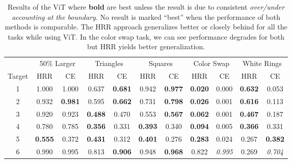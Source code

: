 \documentclass[letterpaper]{article} %
\begin{document}
\begin{table}[!t]
\centering
\begin{tabular}{@{}ccccccccccc@{}}
\toprule
& \multicolumn{2}{c}{50\% Larger} & \multicolumn{2}{c}{Triangles}   & \multicolumn{2}{c}{Squares}     & \multicolumn{2}{c}{Color Swap} & \multicolumn{2}{c}{White Rings} \\ \cmidrule(r){2-3} \cmidrule(r){4-5} \cmidrule(lr){6-7} \cmidrule(r){8-9} \cmidrule(l){10-11} 
Target & HRR & CE & HRR & CE & HRR & CE & HRR & CE & HRR & CE  \\ \midrule
1 & 1.000 & 1.000 & 0.637 & \textbf{0.681} & 0.942 & \textbf{0.977} & \textbf{0.020} & 0.000 & \textbf{0.632} & 0.053 \\
2 & 0.932 & \textbf{0.981} & 0.595 & \textbf{0.662} & 0.731 & \textbf{0.798} & \textbf{0.026} & 0.001 & \textbf{0.616} & 0.113 \\
3 & 0.920 & 0.923 & \textbf{0.488} & 0.470 & 0.553 & \textbf{0.567} & \textbf{0.062} & 0.001 & \textbf{0.467} & 0.187 \\
4 & 0.780 & 0.785 & \textbf{0.356} & 0.331 & \textbf{0.393} & 0.340 & \textbf{0.094} & 0.005 & \textbf{0.366} & 0.331 \\
5 & \textbf{0.555} & 0.372 & \textbf{0.431} & 0.312 & \textbf{0.401} & 0.276 & \textbf{0.283} & 0.024 & 0.267 & \textbf{0.382} \\
6 & 0.990 & 0.995 & 0.813 & \textbf{0.906} & 0.948 & \textbf{0.968} & 0.822 & \textit{0.995} & 0.269 & \textit{0.704} \\ \bottomrule
\end{tabular}
\caption{Results of the ViT where \textbf{bold} are best unless the result is due to consistent \textit{over/under accounting at the boundary}. No result is marked ``best'' when the performance of both methods is comparable. The HRR approach generalizes better or closely behind for all the tasks while using ViT. In the color swap task, we can see performance degrades for both but HRR yields better generalization.} 
\label{tbl:vit}
\end{table}
\end{document}
